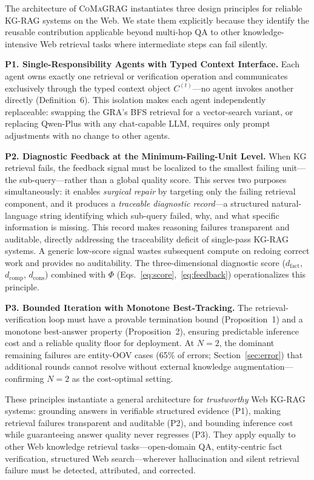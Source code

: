 \documentclass[runningheads]{llncs}
\newcommand{\sys}{\textsc{CoMaGRAG}\xspace}
\begin{document}
The architecture of \sys instantiates three design principles for reliable
KG-RAG systems on the Web. We state them explicitly because they identify
the reusable contribution applicable beyond multi-hop QA to other
knowledge-intensive Web retrieval tasks where intermediate steps can fail
silently.

\smallskip
\noindent\textbf{P1. Single-Responsibility Agents with Typed Context Interface.}
Each agent owns exactly one retrieval or verification operation and communicates
exclusively through the typed context object $C^{(t)}$---no agent invokes another
directly (Definition~6). This isolation makes each agent independently replaceable:
swapping the GRA's BFS retrieval for a vector-search variant, or replacing Qwen-Plus
with any chat-capable LLM, requires only prompt adjustments with no change to other
agents.

\smallskip
\noindent\textbf{P2. Diagnostic Feedback at the Minimum-Failing-Unit Level.}
When KG retrieval fails, the feedback signal must be localized to the smallest
failing unit---the sub-query---rather than a global quality score. This serves
two purposes simultaneously: it enables \emph{surgical repair} by targeting
only the failing retrieval component, and it produces a \emph{traceable
diagnostic record}---a structured natural-language string identifying which
sub-query failed, why, and what specific information is missing. This record
makes reasoning failures transparent and auditable, directly addressing the
traceability deficit of single-pass KG-RAG systems. A generic low-score
signal wastes subsequent compute on redoing correct work and provides no
auditability. The three-dimensional diagnostic score ($d_\text{fact}$,
$d_\text{comp}$, $d_\text{cons}$) combined with $\Phi$
(Eqs.~\ref{eq:score},~\ref{eq:feedback}) operationalizes this principle.

\smallskip
\noindent\textbf{P3. Bounded Iteration with Monotone Best-Tracking.}
The retrieval-verification loop must have a provable termination bound
(Proposition~1) and a monotone best-answer property (Proposition~2), ensuring
predictable inference cost and a reliable quality floor for deployment.
At $N=2$, the dominant remaining failures are entity-OOV cases (65\% of
errors; Section~\ref{sec:error}) that additional rounds cannot resolve without
external knowledge augmentation---confirming $N=2$ as the cost-optimal setting.

\smallskip
These principles instantiate a general architecture for \emph{trustworthy}
Web KG-RAG systems: grounding answers in verifiable structured evidence (P1),
making retrieval failures transparent and auditable (P2), and bounding
inference cost while guaranteeing answer quality never regresses (P3).
They apply equally to other Web knowledge retrieval tasks---open-domain QA,
entity-centric fact verification, structured Web search---wherever hallucination
and silent retrieval failure must be detected, attributed, and corrected.
\end{document}

